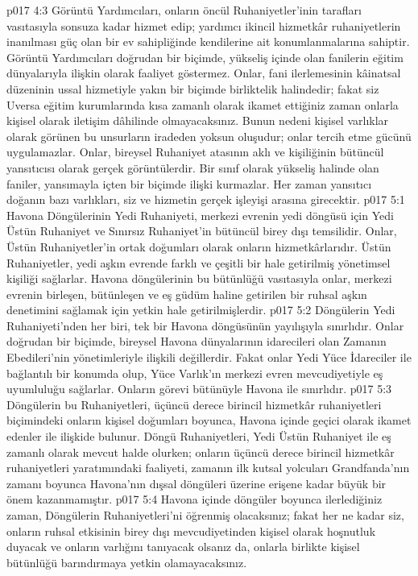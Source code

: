 \vs p017 4:3 Görüntü Yardımcıları, onların öncül Ruhaniyetler’inin tarafları vasıtasıyla sonsuza kadar hizmet edip; yardımcı ikincil hizmetkâr ruhaniyetlerin inanılması güç olan bir ev sahipliğinde kendilerine ait konumlanmalarına sahiptir. Görüntü Yardımcıları doğrudan bir biçimde, yükseliş içinde olan fanilerin eğitim dünyalarıyla ilişkin olarak faaliyet göstermez. Onlar, fani ilerlemesinin kâinatsal düzeninin ussal hizmetiyle yakın bir biçimde birliktelik halindedir; fakat siz Uversa eğitim kurumlarında kısa zamanlı olarak ikamet ettiğiniz zaman onlarla kişisel olarak iletişim dâhilinde olmayacaksınız. Bunun nedeni kişisel varlıklar olarak görünen bu unsurların iradeden yoksun oluşudur; onlar tercih etme gücünü uygulamazlar. Onlar, bireysel Ruhaniyet atasının aklı ve kişiliğinin bütüncül yansıtıcısı olarak gerçek görüntülerdir. Bir sınıf olarak yükseliş halinde olan faniler, yansımayla içten bir biçimde ilişki kurmazlar. Her zaman yansıtıcı doğanın bazı varlıkları, siz ve hizmetin gerçek işleyişi arasına girecektir.
\vs p017 5:1 Havona Döngülerinin Yedi Ruhaniyeti, merkezi evrenin yedi döngüsü için Yedi Üstün Ruhaniyet ve Sınırsız Ruhaniyet’in bütüncül birey dışı temsilidir. Onlar, Üstün Ruhaniyetler’in ortak doğumları olarak onların hizmetkârlarıdır. Üstün Ruhaniyetler, yedi aşkın evrende farklı ve çeşitli bir hale getirilmiş yönetimsel kişiliği sağlarlar. Havona döngülerinin bu bütünlüğü vasıtasıyla onlar, merkezi evrenin birleşen, bütünleşen ve eş güdüm haline getirilen bir ruhsal aşkın denetimini sağlamak için yetkin hale getirilmişlerdir.
\vs p017 5:2 Döngülerin Yedi Ruhaniyeti’nden her biri, tek bir Havona döngüsünün yayılışıyla sınırlıdır. Onlar doğrudan bir biçimde, bireysel Havona dünyalarının idarecileri olan Zamanın Ebedileri’nin yönetimleriyle ilişkili değillerdir. Fakat onlar Yedi Yüce İdareciler ile bağlantılı bir konumda olup, Yüce Varlık’ın merkezi evren mevcudiyetiyle eş uyumluluğu sağlarlar. Onların görevi bütünüyle Havona ile sınırlıdır.
\vs p017 5:3 Döngülerin bu Ruhaniyetleri, üçüncü derece birincil hizmetkâr ruhaniyetleri biçimindeki onların kişisel doğumları boyunca, Havona içinde geçici olarak ikamet edenler ile ilişkide bulunur. Döngü Ruhaniyetleri, Yedi Üstün Ruhaniyet ile eş zamanlı olarak mevcut halde olurken; onların üçüncü derece birincil hizmetkâr ruhaniyetleri yaratımındaki faaliyeti, zamanın ilk kutsal yolcuları Grandfanda’nın zamanı boyunca Havona’nın dışsal döngüleri üzerine erişene kadar büyük bir önem kazanmamıştır.
\vs p017 5:4 Havona içinde döngüler boyunca ilerlediğiniz zaman, Döngülerin Ruhaniyetleri’ni öğrenmiş olacaksınız; fakat her ne kadar siz, onların ruhsal etkisinin birey dışı mevcudiyetinden kişisel olarak hoşnutluk duyacak ve onların varlığını tanıyacak olsanız da, onlarla birlikte kişisel bütünlüğü barındırmaya yetkin olamayacaksınız.
